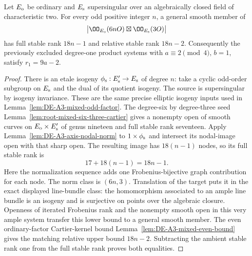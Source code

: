 \begin{corollary}
\label{cor:DE-A3-mixed-thin-vone}
Let $E_{\rm o}$ be ordinary and $E_{\rm s}$ supersingular over
an algebraically closed field of characteristic two.
For every odd positive integer $n$, a general smooth member of
\[
          \bigl|\OO_{E_{\rm o}}(6nO)
                     \boxtimes\OO_{E_{\rm s}}(3O)\bigr|
\]
has full stable rank $18n-1$ and relative stable rank $18n-2$.
Consequently the previously excluded degree-one product
systems with $a\equiv2\pmod4$, $b=1$, satisfy
$r_1=9a-2$.
\end{corollary}
\begin{proof}
There is an etale isogeny
$\phi_{\rm s}:E'_{\rm s}\to E_{\rm s}$ of degree $n$:
take a cyclic odd-order subgroup on $E_{\rm s}$ and the dual
of its quotient isogeny.  The source is supersingular by
isogeny invariance.  These are the same precise elliptic
isogeny inputs used in
Lemma~\ref{lem:DE-A3-mixed-odd-factor}.
The degree-six by degree-three seed
Lemma~\ref{lem:root-mixed-six-three-cartier}
gives a nonempty open of smooth curves on
$E_{\rm o}\times E'_{\rm s}$ of genus nineteen and full stable
rank seventeen.
Apply Lemma~\ref{lem:DE-A3-axis-nodal-norm} to
$1\times\phi_{\rm s}$ and intersect its nodal-image open
with that sharp open.
The resulting image has $18(n-1)$ nodes, so its full stable
rank is
\[
                         17+18(n-1)=18n-1.
\]
Here the normalization sequence adds one Frobenius-bijective
graph contribution for each node.
The norm class is $(6n,3)$.
Translation of the target puts it in the exact displayed
line-bundle class: the homomorphism associated to an ample
line bundle is an isogeny and is surjective on points over
the algebraic closure.
Openness of iterated Frobenius rank and the nonempty smooth
open in this very ample system transfer this lower bound
to a general smooth member.
The even ordinary-factor Cartier-kernel bound
Lemma~\ref{lem:DE-A3-mixed-even-bound}
gives the matching relative upper bound $18n-2$.
Subtracting the ambient stable rank one from the full stable
rank proves both equalities.
\end{proof}

